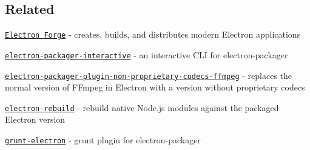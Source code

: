 \subsection*{Related}


\begin{DoxyItemize}
\item \href{https://www.npmjs.com/package/electron-forge}{\tt Electron Forge} -\/ creates, builds, and distributes modern Electron applications
\item \href{https://github.com/Urucas/electron-packager-interactive}{\tt electron-\/packager-\/interactive} -\/ an interactive C\+LI for electron-\/packager
\item \href{https://www.npmjs.com/package/electron-packager-plugin-non-proprietary-codecs-ffmpeg}{\tt electron-\/packager-\/plugin-\/non-\/proprietary-\/codecs-\/ffmpeg} -\/ replaces the normal version of F\+Fmpeg in Electron with a version without proprietary codecs
\item \href{https://github.com/electron/electron-rebuild}{\tt electron-\/rebuild} -\/ rebuild native Node.\+js modules against the packaged Electron version
\item \href{https://github.com/sindresorhus/grunt-electron}{\tt grunt-\/electron} -\/ grunt plugin for electron-\/packager 
\end{DoxyItemize}